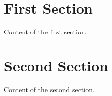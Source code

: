 \documentclass{article}
\begin{document}
\tableofcontents
\section{First Section}
Content of the first section.
\section{Second Section}
Content of the second section.
\end{document}
